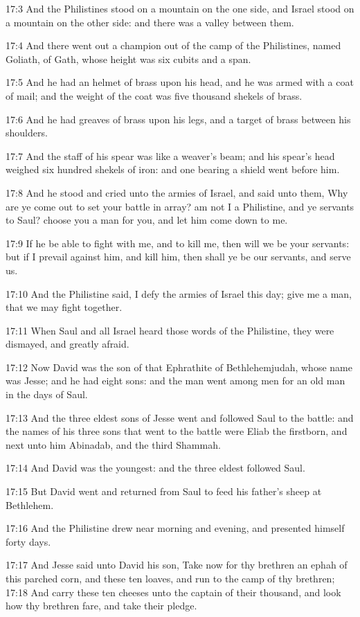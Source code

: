 17:3 And the Philistines stood on a mountain on the one side, and
Israel stood on a mountain on the other side: and there was a valley
between them.

17:4 And there went out a champion out of the camp of the Philistines,
named Goliath, of Gath, whose height was six cubits and a span.

17:5 And he had an helmet of brass upon his head, and he was armed
with a coat of mail; and the weight of the coat was five thousand
shekels of brass.

17:6 And he had greaves of brass upon his legs, and a target of brass
between his shoulders.

17:7 And the staff of his spear was like a weaver's beam; and his
spear's head weighed six hundred shekels of iron: and one bearing a
shield went before him.

17:8 And he stood and cried unto the armies of Israel, and said unto
them, Why are ye come out to set your battle in array? am not I a
Philistine, and ye servants to Saul? choose you a man for you, and let
him come down to me.

17:9 If he be able to fight with me, and to kill me, then will we be
your servants: but if I prevail against him, and kill him, then shall
ye be our servants, and serve us.

17:10 And the Philistine said, I defy the armies of Israel this day;
give me a man, that we may fight together.

17:11 When Saul and all Israel heard those words of the Philistine,
they were dismayed, and greatly afraid.

17:12 Now David was the son of that Ephrathite of Bethlehemjudah,
whose name was Jesse; and he had eight sons: and the man went among
men for an old man in the days of Saul.

17:13 And the three eldest sons of Jesse went and followed Saul to the
battle: and the names of his three sons that went to the battle were
Eliab the firstborn, and next unto him Abinadab, and the third
Shammah.

17:14 And David was the youngest: and the three eldest followed Saul.

17:15 But David went and returned from Saul to feed his father's sheep
at Bethlehem.

17:16 And the Philistine drew near morning and evening, and presented
himself forty days.

17:17 And Jesse said unto David his son, Take now for thy brethren an
ephah of this parched corn, and these ten loaves, and run to the camp
of thy brethren; 17:18 And carry these ten cheeses unto the captain of
their thousand, and look how thy brethren fare, and take their pledge.

